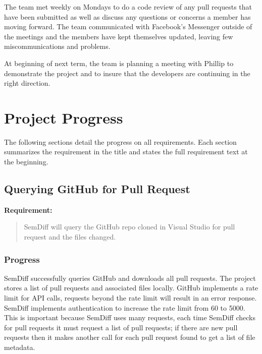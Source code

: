\documentclass[draftclsnofoot,onecolumn]{IEEEtran}
\begin{document}
The team met weekly on Mondays to do a code review of any pull requests that 
have been submitted as well as discuss any questions or concerns a member has 
moving forward. The team communicated with Facebook's Messenger outside of the 
meetings and the members have kept themselves updated, leaving few 
miscommunications and problems.

At beginning of next term, the team is planning a meeting with Phillip to 
demonstrate the project and to insure that the developers are continuing in the 
right direction.

\section{Project Progress}%

The following sections detail the progress on all requirements. Each section 
summarizes the requirement in the title and states the full requirement text at 
the beginning.

\subsection{Querying GitHub for Pull Request}%

\textbf{Requirement:}

\begin{quote}

SemDiff will query the GitHub repo cloned in Visual Studio for pull request 
and the files changed.

\end{quote}

\subsubsection{Progress}

SemDiff successfully queries GitHub and downloads all pull requests. The 
project stores a list of pull requests and associated files locally. GitHub 
implements a rate limit for API calls, requests beyond the rate limit will 
result in an error response. SemDiff implements authentication to increase the 
rate limit from 60 to 5000. This is important because SemDiff uses many 
requests, each time SemDiff checks for pull requests it must request a list 
of pull requests; if there are new pull requests then it makes another call 
for each pull request found to get a list of file metadata.
\end{document}
